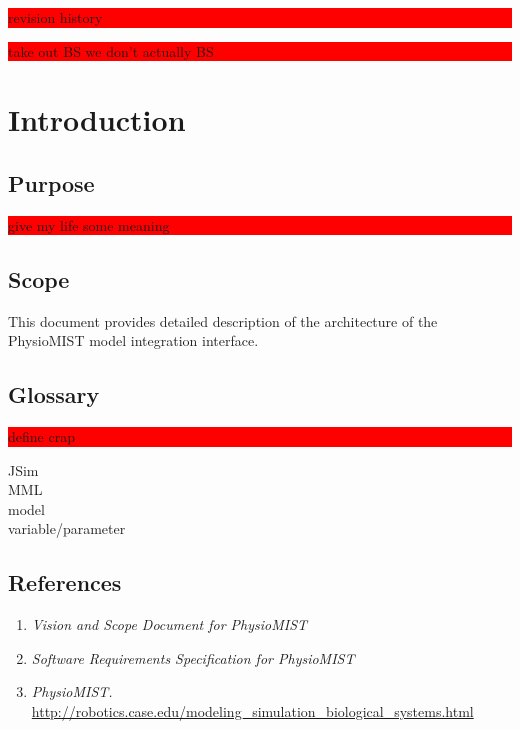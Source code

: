 \documentclass{article}
\title{\todo{PhysioMIST Design Crap}}
\author{Mark Caral, Sara Cummins, BarbaraJoy Jones, Joshua Lee}
\date{October 23, 2009\\{\sc Eecs} 393}
\newcommand{\todo}[1]{\colorbox{red}{\begin{minipage}{\textwidth}{#1}\end{minipage}}}
\begin{document}
\begin{titlepage}
\maketitle\thispagestyle{empty}
\end{titlepage}

\todo{revision history}
\newpage

\tableofcontents
\newpage

\todo{take out BS we don't actually BS}

\section{Introduction}
\subsection{Purpose}
\todo{give my life some meaning}
\subsection{Scope}
This document provides detailed description of the architecture of the PhysioMIST model integration interface.
\subsection{Glossary}
\todo{define crap}
JSim\\
MML\\
model\\
variable/parameter
\subsection{References}
\begin{enumerate}
\item \emph{Vision and Scope Document for PhysioMIST}
\item \emph{Software Requirements Specification for PhysioMIST}
\item \emph{PhysioMIST.} \url{http://robotics.case.edu/modeling_simulation_biological_systems.html}
\end{enumerate}
\end{document}
